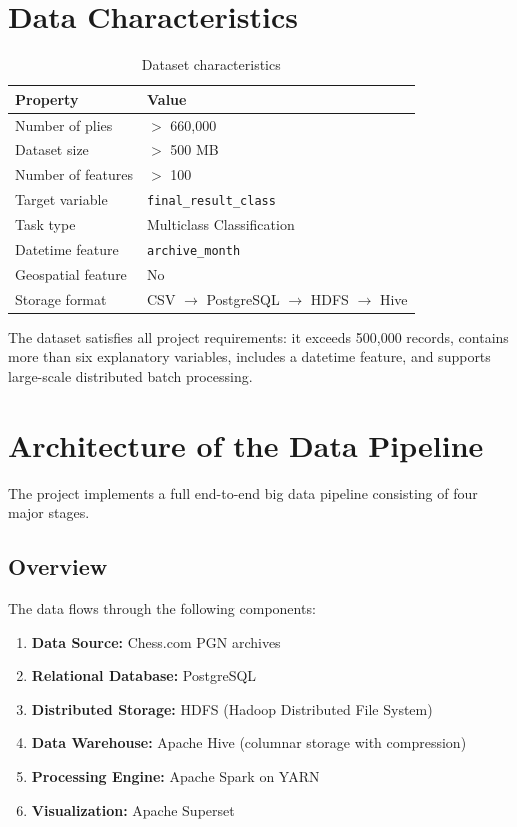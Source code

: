 \documentclass[12pt,a4paper]{article}
\begin{document}
\section{Data Characteristics}

\begin{table}[H]
\centering
\begin{tabular}{ll}
\toprule
\textbf{Property} & \textbf{Value} \\
\midrule
Number of plies & $>$ 660,000 \\
Dataset size & $>$ 500 MB \\
Number of features & $>$ 100 \\
Target variable & \texttt{final\_result\_class} \\
Task type & Multiclass Classification \\
Datetime feature & \texttt{archive\_month} \\
Geospatial feature & No \\
Storage format & CSV $\rightarrow$ PostgreSQL $\rightarrow$ HDFS $\rightarrow$ Hive \\
\bottomrule
\end{tabular}
\caption{Dataset characteristics}
\end{table}

The dataset satisfies all project requirements: it exceeds 500,000 records, contains more than six explanatory variables, includes a datetime feature, and supports large-scale distributed batch processing.
\newpage
\section{Architecture of the Data Pipeline}

The project implements a full end-to-end big data pipeline consisting of four major stages.

\subsection{Overview}

The data flows through the following components:

\begin{enumerate}
    \item \textbf{Data Source:} Chess.com PGN archives
    \item \textbf{Relational Database:} PostgreSQL
    \item \textbf{Distributed Storage:} HDFS (Hadoop Distributed File System)
    \item \textbf{Data Warehouse:} Apache Hive (columnar storage with compression)
    \item \textbf{Processing Engine:} Apache Spark on YARN
    \item \textbf{Visualization:} Apache Superset
\end{enumerate}
\end{document}
